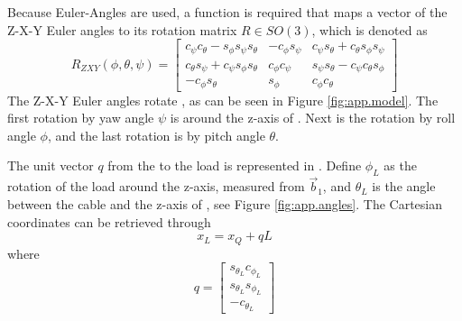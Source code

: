 Because Euler-Angles are used, a function is required that maps a vector of the Z-X-Y Euler angles to its rotation matrix $ R\in SO(3) $, which is denoted as \cite{Mahony2012}
\begin{equation}\label{key}
R_{ZXY}({\phi},{\theta},{\psi})=\begin{bmatrix}
c_{\psi}c_{\theta}-s_{\phi}s_{\psi}s_{\theta}&-c_{\phi}s_{\psi}&c_{\psi}s_{\theta}+c_{\theta}s_{\phi}s_{\psi}\\
c_{\theta}s_{\psi}+c_{\psi}s_{\phi}s_{\theta}&c_{\phi}c_{\psi}&s_{\psi}s_{\theta}-c_{\psi}c_{\theta}s_{\phi}\\
-c_{\phi}s_{\theta}&s_{\phi}&c_{\phi}c_{\theta}
\end{bmatrix}
\end{equation}
The Z-X-Y Euler angles rotate \BF, as can be seen in Figure \ref{fig:app.model}. The first rotation by yaw angle $ \psi $ is around the z-axis of \IF. Next is the rotation by roll angle $ \phi $, and the last rotation is by pitch angle $ \theta $.

The unit vector $ q $ from the  to the load is represented in \BF. Define $ \phi_L $ as the rotation of the load around the z-axis, measured from $ \vec{b}_1 $, and $ \theta_L $ is the angle between the cable and the z-axis of \BF, see Figure \ref{fig:app.angles}.
The Cartesian coordinates can be retrieved through
\begin{equation}\label{eq:app.xL2xQ}
x_L = x_Q+qL
\end{equation}
where
\begin{equation}\label{eq:app.q}
q=
\begin{bmatrix}
s_{\theta_L}c_{\phi_L}\\
s_{\theta_L}s_{\phi_L}\\
-c_{\theta_L}
\end{bmatrix}
\end{equation}




